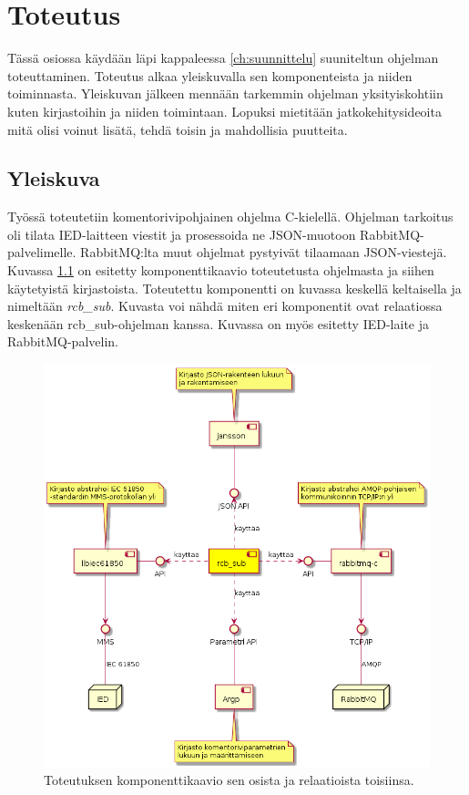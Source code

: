 \chapter{Toteutus}
\label{ch:toteutus}
Tässä osiossa käydään läpi kappaleessa \ref{ch:suunnittelu} suuniteltun ohjelman toteuttaminen. Toteutus alkaa yleiskuvalla sen komponenteista ja niiden toiminnasta. Yleiskuvan jälkeen mennään tarkemmin ohjelman yksityiskohtiin kuten kirjastoihin ja niiden toimintaan. Lopuksi mietitään jatkokehitysideoita mitä olisi voinut lisätä, tehdä toisin ja mahdollisia puutteita.


\section{Yleiskuva}
\label{ch:rcb-sub-yleiskuva}
Työssä toteutetiin komentorivipohjainen ohjelma C-kielellä. Ohjelman tarkoitus oli tilata IED-laitteen viestit ja prosessoida ne JSON-muotoon RabbitMQ-palvelimelle. RabbitMQ:lta muut ohjelmat pystyivät tilaamaan JSON-viestejä. Kuvassa \ref{fig:rcb-sub-komponenttikaavio} on esitetty komponenttikaavio  toteutetusta ohjelmasta ja siihen käytetyistä kirjastoista. Toteutettu komponentti on kuvassa keskellä keltaisella ja nimeltään \emph{rcb\_sub}. Kuvasta voi nähdä miten eri komponentit ovat relaatiossa keskenään rcb\_sub-ohjelman kanssa. Kuvassa on myös esitetty IED-laite ja RabbitMQ-palvelin.

\begin{figure}[ht!]
	\includegraphics[width=1\textwidth]{pictures/rcb-sub-component-diagram.png}
	\caption{Toteutuksen komponenttikaavio sen osista ja relaatioista toisiinsa.}
	\label{fig:rcb-sub-komponenttikaavio}
\end{figure}

